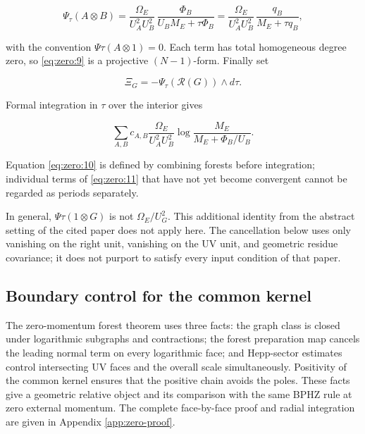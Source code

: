 \documentclass[11pt,a4paper,oneside]{article}
\theoremstyle{plain}
\theoremstyle{definition}
\theoremstyle{remark}
\numberwithin{equation}{section}
\begin{document}
\begin{equation}
\Psi_\tau(A\otimes B)
  =\frac{\Omega_E}{U_A^2U_B^2}\,
              \frac{\Phi_B}{U_BM_E+\tau\Phi_B}
  =\frac{\Omega_E}{U_A^2U_B^2}\,
              \frac{q_B}{M_E+\tau q_B},                       \label{eq:zero:9}
\end{equation}

with the convention \(\Psi \tau (A\otimes 1)=0\). Each term has total homogeneous degree zero, so \eqref{eq:zero:9} is a projective \((N- 1)\)-form. Finally set

\begin{equation}
\Xi_G=-\Psi_\tau(\mathcal R(G))\wedge d\tau.                  \label{eq:zero:10}
\end{equation}

Formal integration in \(\tau \) over the interior gives

\begin{equation}
\sum_{A,B}c_{A,B}\frac{\Omega_E}{U_A^2U_B^2}
              \log\frac{M_E}{M_E+\Phi_B/U_B}.                 \label{eq:zero:11}
\end{equation}

Equation \eqref{eq:zero:10} is defined by combining forests before integration; individual terms of \eqref{eq:zero:11} that have not yet become convergent cannot be regarded as periods separately.

In general, \(\Psi \tau (1\otimes G)\) is not \(\Omega _E/U_G^{2}\). This additional identity from the abstract setting of the cited paper does not apply here. The cancellation below uses only vanishing on the right unit, vanishing on the UV unit, and geometric residue covariance; it does not purport to satisfy every input condition of that paper.


\endgroup
\subsection{Boundary control for the common kernel}
The zero-momentum forest theorem uses three facts: the graph class is closed under logarithmic subgraphs and contractions; the forest preparation map cancels the leading normal term on every logarithmic face; and Hepp-sector estimates control intersecting UV faces and the overall scale simultaneously. Positivity of the common kernel ensures that the positive chain avoids the poles. These facts give a geometric relative object and its comparison with the same BPHZ rule at zero external momentum. The complete face-by-face proof and radial integration are given in Appendix \ref{app:zero-proof}.
\end{document}
